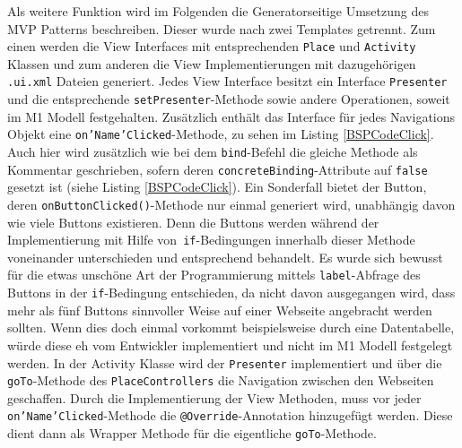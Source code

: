 Als weitere Funktion wird im Folgenden die Generatorseitige Umsetzung des MVP Patterns beschreiben. Dieser wurde nach zwei Templates getrennt. Zum einen werden die View Interfaces mit entsprechenden \texttt{Place} und \texttt{Activity} Klassen und zum anderen die View Implementierungen mit dazugehörigen \texttt{.ui.xml} Dateien generiert.
Jedes View Interface besitzt ein Interface \texttt{Presenter} und die entsprechende \texttt{setPresenter}-Methode sowie andere Operationen, soweit im M1 Modell festgehalten. Zusätzlich enthält das Interface für jedes Navigations Objekt eine \texttt{on'Name'Clicked}-Methode, zu sehen im Listing \ref{BSPCodeClick}. Auch hier wird zusätzlich wie bei dem \texttt{bind}-Befehl die gleiche Methode als Kommentar geschrieben, sofern deren \texttt{concreteBinding}-Attribute auf \texttt{false} gesetzt ist (siehe Listing \ref{BSPCodeClick}). Ein Sonderfall bietet der Button, deren \texttt{onButtonClicked()}-Methode nur einmal generiert wird, unabhängig davon wie viele Buttons existieren. Denn die Buttons werden während der Implementierung mit Hilfe von\texttt{ if}-Bedingungen innerhalb dieser Methode voneinander unterschieden und entsprechend behandelt. Es wurde sich bewusst für die etwas unschöne Art der Programmierung mittels \texttt{label}-Abfrage des Buttons in der \texttt{if}-Bedingung entschieden, da nicht davon ausgegangen wird, dass mehr als fünf Buttons sinnvoller Weise auf einer Webseite angebracht werden sollten. Wenn dies doch einmal vorkommt beispielsweise durch eine Datentabelle, würde diese eh vom Entwickler implementiert und nicht im M1 Modell festgelegt werden.
In der Activity Klasse wird der \texttt{Presenter} implementiert und über die \texttt{goTo}-Methode des \texttt{PlaceControllers} die Navigation zwischen den Webseiten geschaffen. Durch die Implementierung der View Methoden, muss vor jeder \texttt{on'Name'Clicked}-Methode die \texttt{@Override}-Annotation hinzugefügt werden. Diese dient dann als Wrapper Methode für die eigentliche \texttt{goTo}-Methode.
\lstset{language=mtl}
